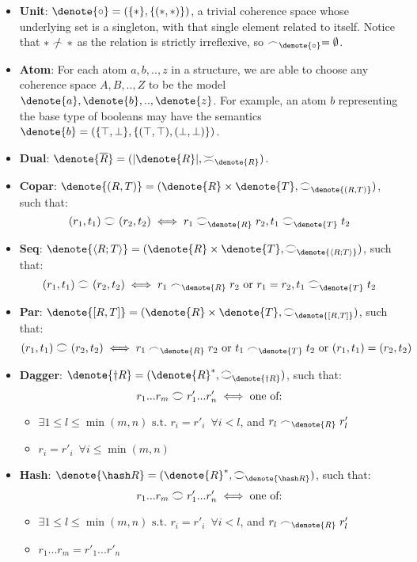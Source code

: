 \documentclass[11pt, oneside]{article}
\theoremstyle{plain}
\theoremstyle{definition}
\let\originaldagger\dagger
\renewcommand{\dag}{\mathord{\originaldagger}}
\DeclarePairedDelimiter\denote\llbracket\rrbracket
\newcommand{\la}{\langle}
\newcommand{\ra}{\rangle}
\newcommand{\coh}[1][]{\mathrel{\vcenter{\offinterlineskip\hbox{$\frown$}\vskip0.2ex\hbox{$\smile$}}_{\ifx\\#1\\\else#1\fi}}}
\newcommand{\incoh}[1][]{\mathrel{\vcenter{\offinterlineskip\hbox{$\smile$}\vskip0.2ex\hbox{$\frown$}}_{\ifx\\#1\\\else#1\fi}}}
\newcommand{\scoh}[1][]{\mathrel{\frown}_{\ifx\\#1\\\else#1\fi}}
\newcommand{\notscoh}[1][]{\mathrel{\ooalign{$\frown$\cr\hidewidth$/$\hidewidth}}_{\ifx\\#1\\\else#1\fi}}
\newcommand{\unit}{\circ}
\begin{document}
\begin{itemize}

\item
\textbf{Unit}: $\denote{\unit} = (\{*\},\{(*,*)\})$, a trivial coherence space whose underlying set is a singleton, with that single element related to itself.
Notice that $* \notscoh[] *$ as the relation is strictly irreflexive, so $\scoh[\denote{\unit}]=\emptyset$.

\item
\textbf{Atom}: For each atom $a,b,..,z$ in a structure, we are able to choose any coherence space $A,B,..,Z$ to be the model $\denote{a},\denote{b},..,\denote{z}$.
For example, an atom $b$ representing the base type of booleans may have the semantics $\denote{b} = (\{\top,\bot\},\{(\top,\top),(\bot,\bot)\})$.

\item
\textbf{Dual}: $\denote{\overline{R}}=(|\denote{R}|,\incoh[\denote{R}])$.

\item
\textbf{Copar}: $\denote{(R,T)} = (\denote{R}\times\denote{T},\coh[\denote{(R,T)}])$,
such that:
$$(r_1,t_1)\coh(r_2,t_2)\iff r_1\coh[\denote{R}]r_2, t_1\coh[\denote{T}]t_2$$

\item
\textbf{Seq}: $\denote{\la R;T\ra} = (\denote{R}\times\denote{T},\coh[\denote{\la R;T\ra}])$, such that:
$$(r_1,t_1)\coh(r_2,t_2) \iff r_1\scoh[\denote{R}]r_2 \text{ or } r_1 = r_2, t_1\coh[\denote{T}]t_2$$

\item
\textbf{Par}: $\denote{[R,T]} = (\denote{R}\times\denote{T},\coh[\denote{[R,T]}])$, such that:
$$(r_1,t_1)\coh(r_2,t_2) \iff r_1\scoh[\denote{R}]r_2 \text{ or } t_1\scoh[\denote{T}]t_2 \text{ or } (r_1,t_1)=(r_2,t_2)$$

\item
\textbf{Dagger}: $\denote{\dag R} = (\denote{R}^*, \coh[\denote{\dag R}])$, such that:
$$r_1...r_m \coh r'_1...r'_n \iff \text{one of:}$$

\begin{itemize}
    \item
    $\exists 1\leq l \leq \min(m,n) \text{ s.t. } r_i=r'_i \enspace\forall i<l$, and $r_l \scoh[\denote{R}] r'_l$

    \item
    $r_i = r'_i \enspace\forall i\le\min(m,n)$
\end{itemize}

\item
\textbf{Hash}: $\denote{\hash R} = (\denote{R}^*, \coh[\denote{\hash R}])$, such that:
$$r_1...r_m \coh r'_1...r'_n \iff \text{one of:}$$

\begin{itemize}
    \item
    $\exists 1\leq l \leq \min(m,n) \text{ s.t. } r_i=r'_i \enspace\forall i<l$, and $r_l \scoh[\denote{R}] r'_l$

    \item
    $r_1...r_m = r'_1...r'_n$
\end{itemize}

\end{itemize}
\end{document}
